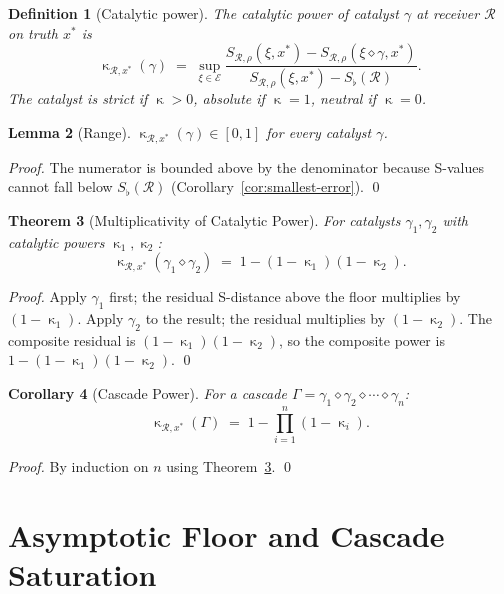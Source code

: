 \documentclass[twocolumn,a4paper]{article}
\newtheorem{theorem}{Theorem}[section]
\newtheorem{lemma}[theorem]{Lemma}
\newtheorem{corollary}[theorem]{Corollary}
\newtheorem{definition}[theorem]{Definition}
\DeclareMathOperator{\catpow}{\kappa}
\newcommand{\Expr}{\mathcal{E}}
\newcommand{\receiver}{\mathcal{R}}
\newcommand{\Sscalar}{S}
\newcommand{\Sfloor}{S_{\flat}}
\begin{document}
\begin{definition}[Catalytic power]
\label{def:catalytic-power}
The \emph{catalytic power} of catalyst $\gamma$ at receiver $\receiver$ on truth $x^{*}$ is
\[
\catpow_{\receiver,x^{*}}(\gamma)\;=\;\sup_{\xi\in\Expr}\frac{\Sscalar_{\receiver,\rho}(\xi,x^{*})-\Sscalar_{\receiver,\rho}(\xi\diamond\gamma,x^{*})}{\Sscalar_{\receiver,\rho}(\xi,x^{*})-\Sfloor(\receiver)}.
\]
The catalyst is \emph{strict} if $\catpow>0$, \emph{absolute} if $\catpow=1$, \emph{neutral} if $\catpow=0$.
\end{definition}

\begin{lemma}[Range]
\label{lem:cat-range}
$\catpow_{\receiver,x^{*}}(\gamma)\in[0,1]$ for every catalyst $\gamma$.
\end{lemma}

\begin{proof}
The numerator is bounded above by the denominator because S-values cannot fall below $\Sfloor(\receiver)$ (Corollary~\ref{cor:smallest-error}). \qed
\end{proof}

\begin{theorem}[Multiplicativity of Catalytic Power]
\label{thm:multiplicativity}
For catalysts $\gamma_{1},\gamma_{2}$ with catalytic powers $\catpow_{1},\catpow_{2}$:
\[
\catpow_{\receiver,x^{*}}(\gamma_{1}\diamond\gamma_{2})\;=\;1-(1-\catpow_{1})(1-\catpow_{2}).
\]
\end{theorem}

\begin{proof}
Apply $\gamma_{1}$ first; the residual S-distance above the floor multiplies by $(1-\catpow_{1})$. Apply $\gamma_{2}$ to the result; the residual multiplies by $(1-\catpow_{2})$. The composite residual is $(1-\catpow_{1})(1-\catpow_{2})$, so the composite power is $1-(1-\catpow_{1})(1-\catpow_{2})$. \qed
\end{proof}

\begin{corollary}[Cascade Power]
\label{cor:cascade-power}
For a cascade $\Gamma=\gamma_{1}\diamond\gamma_{2}\diamond\cdots\diamond\gamma_{n}$:
\[
\catpow_{\receiver,x^{*}}(\Gamma)\;=\;1-\prod_{i=1}^{n}(1-\catpow_{i}).
\]
\end{corollary}

\begin{proof}
By induction on $n$ using Theorem~\ref{thm:multiplicativity}. \qed
\end{proof}

\section{Asymptotic Floor and Cascade Saturation}
\label{sec:cascade-saturation}
\end{document}
